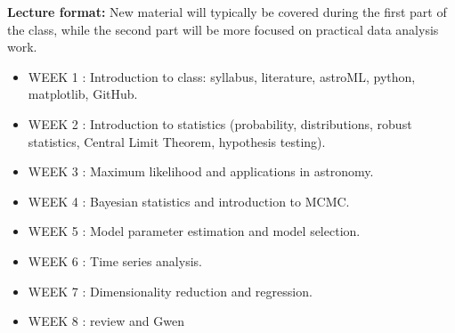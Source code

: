 \documentclass[10pt]{article}
\begin{document}
{\bf Lecture format:}
New material will typically be covered during the first part of the class, while
the second part will be more focused on practical data analysis work. 

\newpage 
\begin{itemize}
\item WEEK 1 : 
      Introduction to class: syllabus, literature, astroML, python, matplotlib, GitHub. 
\item WEEK  2 : Introduction to statistics (probability, distributions, 
             robust statistics, Central Limit Theorem,  hypothesis testing).
\item WEEK  3 :  Maximum likelihood and applications in astronomy.
\item WEEK  4 :  Bayesian statistics and introduction to MCMC.
\item WEEK  5 :  Model parameter estimation and model selection.

\item WEEK  6 :   Time series analysis.

\item WEEK  7 : Dimensionality reduction and regression.

\item WEEK  8 :  review and Gwen 




\end{itemize}
\end{document}
